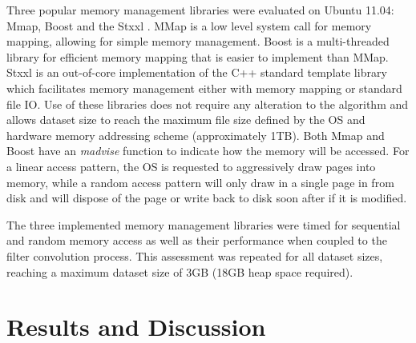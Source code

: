 \documentclass[11pt, twoside]{article}
\begin{document}
Three popular memory management libraries were evaluated on Ubuntu 11.04: Mmap, Boost \citep{Gaz2012} and the Stxxl \citep{Dementiev2005}.
MMap is a low level system call for memory mapping, allowing for simple memory management.
Boost is a multi-threaded library for efficient memory mapping that is easier to implement than MMap.
 Stxxl is an out-of-core implementation of the C++ standard template library which facilitates memory management either with memory mapping or standard file IO.
Use of these libraries does not require any alteration to the algorithm  and allows dataset size to reach
the maximum file size defined by the OS and hardware memory addressing scheme (approximately 1TB).
Both Mmap and Boost have an \emph{madvise}  function to indicate how the memory will be accessed.
For a linear access pattern, the OS is requested to aggressively draw pages into memory, while  a random access pattern will only draw in a single page in from disk and will dispose of the page or write back to disk soon after if it is modified.

The three implemented memory management libraries were timed for sequential and random memory access as well as their performance when coupled to the filter convolution process.  This assessment  was repeated for all dataset sizes, reaching a maximum dataset size of 3GB (18GB heap space required). 



 
\section{Results and Discussion}
  
\end{document}
